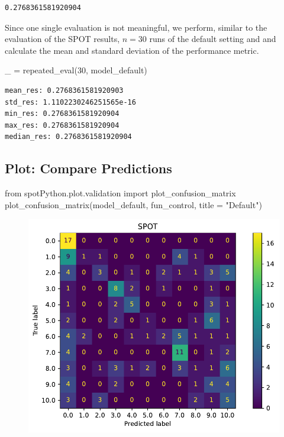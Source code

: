 \documentclass[
  letterpaper,
  DIV=11,
  numbers=noendperiod]{scrreprt}
\newenvironment{Shaded}{\begin{snugshade}}{\end{snugshade}}
\newcommand{\DecValTok}[1]{\textcolor[rgb]{0.68,0.00,0.00}{#1}}
\newcommand{\ImportTok}[1]{\textcolor[rgb]{0.00,0.46,0.62}{#1}}
\newcommand{\NormalTok}[1]{\textcolor[rgb]{0.00,0.23,0.31}{#1}}
\newcommand{\OperatorTok}[1]{\textcolor[rgb]{0.37,0.37,0.37}{#1}}
\newcommand{\StringTok}[1]{\textcolor[rgb]{0.13,0.47,0.30}{#1}}
\begin{document}
\begin{verbatim}
0.2768361581920904
\end{verbatim}

Since one single evaluation is not meaningful, we perform, similar to
the evaluation of the SPOT results, \(n=30\) runs of the default setting
and and calculate the mean and standard deviation of the performance
metric.

\begin{Shaded}
\begin{Highlighting}[]
\NormalTok{\_ }\OperatorTok{=}\NormalTok{ repeated\_eval(}\DecValTok{30}\NormalTok{, model\_default)}
\end{Highlighting}
\end{Shaded}

\begin{verbatim}
mean_res: 0.2768361581920903
std_res: 1.1102230246251565e-16
min_res: 0.2768361581920904
max_res: 0.2768361581920904
median_res: 0.2768361581920904
\end{verbatim}

\hypertarget{plot-compare-predictions-4}{%
\subsection{Plot: Compare
Predictions}\label{plot-compare-predictions-4}}

\begin{Shaded}
\begin{Highlighting}[]
\ImportTok{from}\NormalTok{ spotPython.plot.validation }\ImportTok{import}\NormalTok{ plot\_confusion\_matrix}
\NormalTok{plot\_confusion\_matrix(model\_default, fun\_control, title }\OperatorTok{=} \StringTok{"Default"}\NormalTok{)}
\end{Highlighting}
\end{Shaded}

\begin{figure}[H]

{\centering \includegraphics{19_spot_hpt_sklearn_multiclass_classification_knn_files/figure-pdf/cell-41-output-1.pdf}

}

\end{figure}
\end{document}
